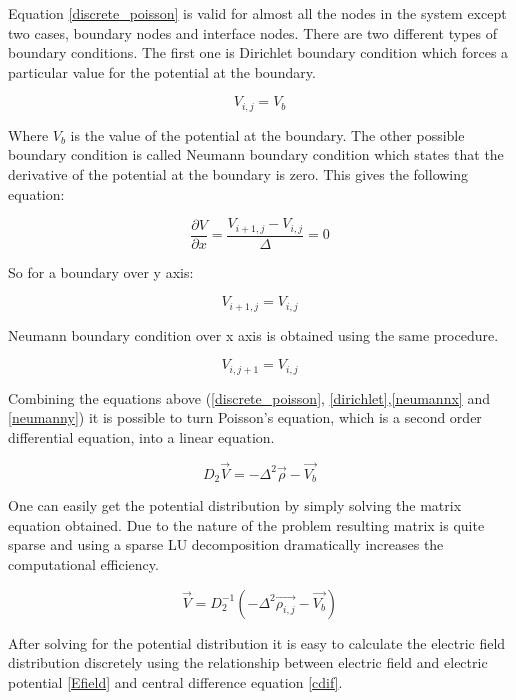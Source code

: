 \begin{doublespace}
Equation \ref{discrete_poisson} is valid for almost all the nodes in the system except two cases, boundary nodes and interface nodes. There are two different types of boundary conditions. The first one is Dirichlet boundary condition which forces a particular value for the potential at the boundary.

\begin{equation}
V_{i,j}=V_{b}
\label{dirichlet}
\end{equation}

Where $V_{b}$ is the value of the potential at the boundary. The other possible boundary condition is called Neumann boundary condition which states that the derivative of the potential at the boundary is zero. This gives the following equation:

\begin{equation}
\frac{\partial V}{\partial x}=\frac{V_{i+1,j}-V_{i,j}}{\Delta}=0
\label{neumannx}
\end{equation}

So for a boundary over y axis:

\begin{equation}
V_{i+1,j}=V_{i,j}
\label{neumanny}
\end{equation}

Neumann boundary condition over x axis is obtained using the same procedure.

\begin{equation}
V_{i,j+1}=V_{i,j}
\end{equation}

Combining the equations above (\ref{discrete_poisson}, \ref{dirichlet},\ref{neumannx} and \ref{neumanny}) it is possible to turn Poisson's equation, which is a second order differential equation, into a linear equation.

\begin{equation}
D_{2}\vec{V}=-\Delta^2\vec{\rho}-\vec{V_b}
\end{equation}

One can easily get the potential distribution by simply solving the matrix equation obtained. Due to the nature of the problem resulting matrix is quite sparse and using a sparse LU decomposition dramatically increases the computational efficiency.

\begin{equation}
\vec{V}=D_{2}^{-1}(-\Delta^2\vec{\rho_{i,j}}-\vec{V_b})
\end{equation}

After solving for the potential distribution it is easy to calculate the electric field distribution discretely using the relationship between electric field and electric potential \eqref{Efield} and central difference equation \eqref{cdif}. 


\end{doublespace}
